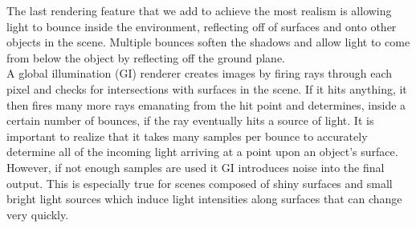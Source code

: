 \documentclass[10pt,twocolumn,letterpaper]{article}
\begin{document}

The last rendering feature that we add to achieve the most realism is allowing light to bounce inside the environment, reflecting off of surfaces and onto other objects in the scene.  Multiple bounces soften the shadows and allow light to come from below the object by reflecting off the ground plane.\\


A global illumination (GI) renderer creates images by firing rays through each pixel and checks for intersections with surfaces in the scene.  If it hits anything, it then fires many more rays emanating from the hit point and determines, inside a certain number of bounces, if the ray eventually hits a source of light.  It is important to realize that it takes many samples per bounce to accurately determine all of the incoming light arriving at a point upon an object's surface.
However, if not enough samples are used it GI introduces noise into the final output. This is especially true for scenes composed of shiny surfaces and small bright light sources which induce light intensities along surfaces that can change very quickly.\\
\end{document}
